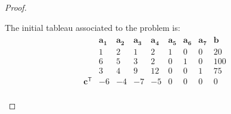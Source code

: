 \documentclass[12pt]{article}
\theoremstyle{definition}
\newcommand{\vect}[1]{\boldsymbol{#1}}
\newcommand{\tran}{\mathsf{T}}
\begin{document}
\begin{proof}
\begin{enumerate}
      The initial tableau associated to the problem is:
      \begin{align*}
        \begin{matrix}
          & \vect{a_1} & \vect{a_2} & \vect{a_3} & \vect{a_4} & \vect{a_5} & \vect{a_6} & \vect{a_7} & \vect{b} \\
                         & 1 & 2 & 1 & 2 & 1 & 0 & 0 & 20 \\
                         & 6 & 5 & 3 & 2 & 0 & 1 & 0 & 100 \\
                         & 3 & 4 & 9 & 12 & 0 & 0 & 1 & 75 \\
          \vect{c}^\tran  & -6 & -4 & -7 & -5 & 0 & 0 & 0 & 0 \\
        \end{matrix}
      \end{align*}


\end{enumerate}
\end{proof}
\end{document}
